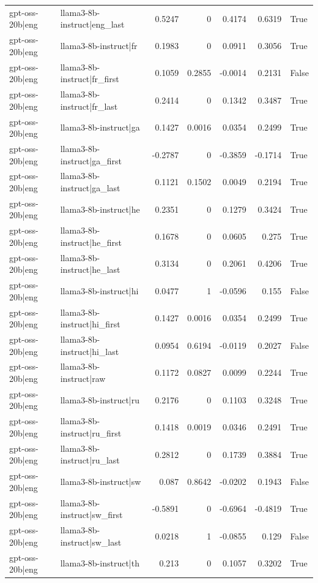 \begin{table}
\begin{tabular}{l l r r r r l}
gpt-oss-20b|eng & llama3-8b-instruct|eng_last & 0.5247 & 0 & 0.4174 & 0.6319 & True \\
gpt-oss-20b|eng & llama3-8b-instruct|fr & 0.1983 & 0 & 0.0911 & 0.3056 & True \\
gpt-oss-20b|eng & llama3-8b-instruct|fr_first & 0.1059 & 0.2855 & -0.0014 & 0.2131 & False \\
gpt-oss-20b|eng & llama3-8b-instruct|fr_last & 0.2414 & 0 & 0.1342 & 0.3487 & True \\
gpt-oss-20b|eng & llama3-8b-instruct|ga & 0.1427 & 0.0016 & 0.0354 & 0.2499 & True \\
gpt-oss-20b|eng & llama3-8b-instruct|ga_first & -0.2787 & 0 & -0.3859 & -0.1714 & True \\
gpt-oss-20b|eng & llama3-8b-instruct|ga_last & 0.1121 & 0.1502 & 0.0049 & 0.2194 & True \\
gpt-oss-20b|eng & llama3-8b-instruct|he & 0.2351 & 0 & 0.1279 & 0.3424 & True \\
gpt-oss-20b|eng & llama3-8b-instruct|he_first & 0.1678 & 0 & 0.0605 & 0.275 & True \\
gpt-oss-20b|eng & llama3-8b-instruct|he_last & 0.3134 & 0 & 0.2061 & 0.4206 & True \\
gpt-oss-20b|eng & llama3-8b-instruct|hi & 0.0477 & 1 & -0.0596 & 0.155 & False \\
gpt-oss-20b|eng & llama3-8b-instruct|hi_first & 0.1427 & 0.0016 & 0.0354 & 0.2499 & True \\
gpt-oss-20b|eng & llama3-8b-instruct|hi_last & 0.0954 & 0.6194 & -0.0119 & 0.2027 & False \\
gpt-oss-20b|eng & llama3-8b-instruct|raw & 0.1172 & 0.0827 & 0.0099 & 0.2244 & True \\
gpt-oss-20b|eng & llama3-8b-instruct|ru & 0.2176 & 0 & 0.1103 & 0.3248 & True \\
gpt-oss-20b|eng & llama3-8b-instruct|ru_first & 0.1418 & 0.0019 & 0.0346 & 0.2491 & True \\
gpt-oss-20b|eng & llama3-8b-instruct|ru_last & 0.2812 & 0 & 0.1739 & 0.3884 & True \\
gpt-oss-20b|eng & llama3-8b-instruct|sw & 0.087 & 0.8642 & -0.0202 & 0.1943 & False \\
gpt-oss-20b|eng & llama3-8b-instruct|sw_first & -0.5891 & 0 & -0.6964 & -0.4819 & True \\
gpt-oss-20b|eng & llama3-8b-instruct|sw_last & 0.0218 & 1 & -0.0855 & 0.129 & False \\
gpt-oss-20b|eng & llama3-8b-instruct|th & 0.213 & 0 & 0.1057 & 0.3202 & True \\

\end{tabular}
\end{table}
